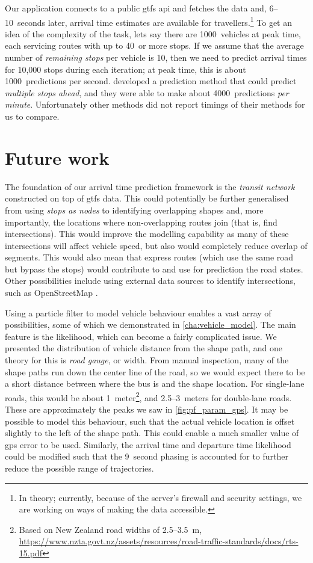 Our application connects to a public \gls{gtfs} \gls{api} and fetches the data and, 6--10~seconds later, arrival time estimates are available for travellers.\footnote{In theory; currently, because of the server's firewall and security settings, we are working on ways of making the data accessible.} To get an idea of the complexity of the task, lets say there are 1000~vehicles at peak time, each servicing routes with up to 40~or more stops. If we assume that the average number of \emph{remaining stops} per vehicle is 10, then we need to predict arrival times for 10,000 stops during each iteration; at peak time, this is about 1000~predictions per second. \citet{Chang_2010} developed a prediction method that could predict \emph{multiple stops ahead}, and they were able to make about 4000~predictions \emph{per minute}. Unfortunately other methods did not report timings of their methods for us to compare.


\section{Future work}

The foundation of our arrival time prediction framework is the \emph{transit network} constructed on top of \gls{gtfs} data. This could potentially be further generalised from using \emph{stops as nodes} to identifying overlapping shapes and, more importantly, the locations where non-overlapping routes join (that is, find intersections). This would improve the modelling capability as many of these intersections will affect vehicle speed, but also would completely reduce overlap of segments. This would also mean that express routes (which use the same road but bypass the stops) would contribute to and use for prediction the road states. Other possibilities include using external data sources to identify intersections, such as OpenStreetMap \citep{OpenStreetMap_2017}.


Using a particle filter to model vehicle behaviour enables a vast array of possibilities, some of which we demonstrated in \cref{cha:vehicle_model}. The main feature is the likelihood, which can become a fairly complicated issue. We presented the distribution of vehicle distance from the shape path, and one theory for this is \emph{road gauge}, or width. From manual inspection, many of the shape paths run down the center line of the road, so we would expect there to be a short distance between where the bus is and the shape location. For single-lane roads, this would be about 1~meter\footnote{Based on New Zealand road widths of 2.5--3.5~m, \url{https://www.nzta.govt.nz/assets/resources/road-traffic-standards/docs/rts-15.pdf}}, and 2.5--3~meters for double-lane roads. These are approximately the peaks we saw in \cref{fig:pf_param_gps}. It may be possible to model this behaviour, such that the actual vehicle location is offset slightly to the left of the shape path. This could enable a much smaller value of \gls{gps} error to be used. Similarly, the arrival time and departure time likelihood could be modified such that the 9~second phasing is accounted for to further reduce the possible range of trajectories.


